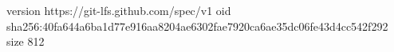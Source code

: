 version https://git-lfs.github.com/spec/v1
oid sha256:40fa644a6ba1d77e916aa8204ae6302fae7920ca6ae35dc06fe43d4cc542f292
size 812
